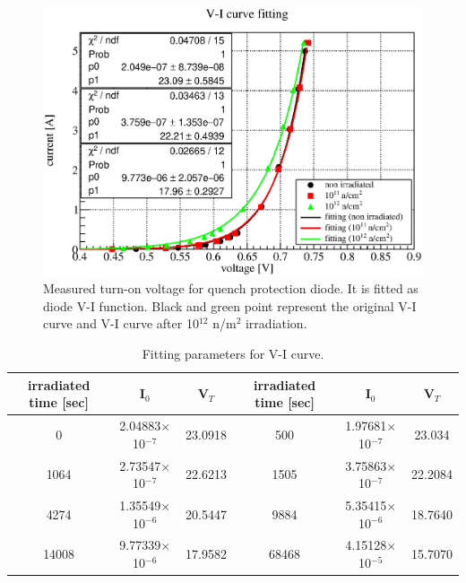   \begin{figure}[H]
    \centering
    \includegraphics[scale=0.45]{chapter4/fig/diodefit.eps}
   \caption{Measured turn-on voltage for quench protection diode. It is fitted as diode V-I function. Black and green point represent the original V-I curve and V-I curve after 10$^{12}$ n/m$^2$ irradiation.}
   \label{3fitdiode}
  \end{figure}
 
\begin{table}[H]
 \centering
 \begin{tabular}{cccccc} \hline \hline
  irradiated time [sec] & I$_0$ & V$_T$ & irradiated time [sec] & I$_0$ & V$_T$ \\ \hline
  0 & 2.04883$\times$10$^{-7}$ & 23.0918 & 500 & 1.97681$\times$10$^{-7}$ & 23.034 \\
  1064 & 2.73547$\times$10$^{-7}$ & 22.6213 & 1505 & 3.75863$\times$10$^{-7}$ & 22.2084 \\
  4274 & 1.35549$\times$10$^{-6}$ & 20.5447 & 9884 & 5.35415$\times$10$^{-6}$ & 18.7640 \\
  14008 & 9.77339$\times$10$^{-6}$ & 17.9582 & 68468 & 4.15128$\times$10$^{-5}$ & 15.7070 \\ \hline \hline
 \end{tabular}
 \caption{Fitting parameters for V-I curve.}
 \label{fit3}
\end{table}

